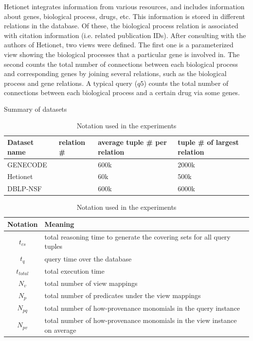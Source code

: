 Hetionet integrates information from various resources, and includes information about genes, biological process, drugs, etc.  This information is stored in different relations in the database. Of these, the biological process relation is associated with citation information (i.e. related publication IDs). After consulting with the authors of Hetionet, two views were defined. The first one is a parameterized view showing the  biological processes that a particular gene is involved in. The second counts the total number of connections between each biological process and corresponding genes by joining several relations, such as the biological process and gene relations.  A typical query ($q5$) counts the total number of connections between each biological process and a certain drug via some genes.


\begin{table}
\centering
\small
\caption{Summary of datasets}
\vspace*{-0.2cm}
\begin{tabular}[!h]{|>{\centering\arraybackslash}p{2cm}|>{\centering\arraybackslash}p{1.5cm}|>{\centering\arraybackslash}p{2cm}|>{\centering\arraybackslash}p{2cm}|} \hline
Dataset name& relation \# &average tuple \# per relation& tuple \# of largest relation \\ \hline
GENECODE&7&600k&2000k \\ \hline
Hetionet&38&60k&500k \\ \hline
DBLP-NSF&17&600k&6000k \\ \hline
\end{tabular}
\medskip
\label{Table: datasets_summary}
\caption{Notation used in the experiments}
\vspace*{-0.2cm}
\begin{tabular}[!h]{|c|>{\centering\arraybackslash}p{6.8cm}|} \hline
Notation & Meaning \\ \hline
$t_{cs}$&total reasoning time to generate the covering sets for all query tuples \\ \hline
$t_{q}$&query time over the database \\ \hline
$t_{total}$&total execution time \\ \hline
$N_v$&total number of view mappings \\ \hline
$N_p$&total number of predicates under the view mappings \\ \hline
$N_{pq}$&total number of how-provenance monomials in the query instance \\ \hline
$N_{pv}$&total number of how-provenance monomials in the view instance on average\\ \hline

\end{tabular}
\end{table}
